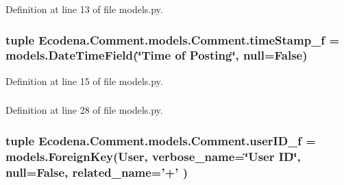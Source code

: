 Definition at line 13 of file models.py.

\hypertarget{class_ecodena_1_1_comment_1_1models_1_1_comment_aaaea3223dc455aa4dd3de1e74581e88e}{
\subsubsection[{timeStamp\_\-f}]{\setlength{\rightskip}{0pt plus 5cm}tuple {\bf Ecodena.Comment.models.Comment.timeStamp\_\-f} = models.DateTimeField(\char`\"{}Time of Posting\char`\"{}, null=False)}}
\label{d9/d86/class_ecodena_1_1_comment_1_1models_1_1_comment_aaaea3223dc455aa4dd3de1e74581e88e}


Definition at line 15 of file models.py.

\hypertarget{class_ecodena_1_1_comment_1_1models_1_1_comment_a48f0a7161209f9fca70c75637384c6b6}{
\subsubsection[{timeStamp\_\-f}]{}}
\label{d9/d86/class_ecodena_1_1_comment_1_1models_1_1_comment_a48f0a7161209f9fca70c75637384c6b6}


Definition at line 28 of file models.py.

\hypertarget{class_ecodena_1_1_comment_1_1models_1_1_comment_aabc6fe0feb8814bacc07dced3de8e401}{
\subsubsection[{userID\_\-f}]{\setlength{\rightskip}{0pt plus 5cm}tuple {\bf Ecodena.Comment.models.Comment.userID\_\-f} = models.ForeignKey(User, verbose\_\-name=\char`\"{}User ID\char`\"{}, null=False, related\_\-name='+' )}}
\label{d9/d86/class_ecodena_1_1_comment_1_1models_1_1_comment_aabc6fe0feb8814bacc07dced3de8e401}


